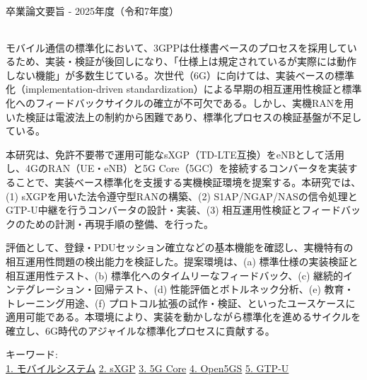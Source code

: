 卒業論文要旨 - 2025年度（令和7年度）
\begin{center}
\begin{large}
\end{large}
\end{center}
\begin{spacing}{1.2}
\small
モバイル通信の標準化において、3GPPは仕様書ベースのプロセスを採用しているため、実装・検証が後回しになり、「仕様上は規定されているが実際には動作しない機能」が多数生じている。次世代（6G）に向けては、実装ベースの標準化（implementation-driven standardization）による早期の相互運用性検証と標準化へのフィードバックサイクルの確立が不可欠である。しかし、実機RANを用いた検証は電波法上の制約から困難であり、標準化プロセスの検証基盤が不足している。

本研究は、免許不要帯で運用可能なsXGP（TD-LTE互換）をeNBとして活用し、4GのRAN（UE・eNB）と5G Core（5GC）を接続するコンバータを実装することで、実装ベース標準化を支援する実機検証環境を提案する。本研究では、(1) sXGPを用いた法令遵守型RANの構築、(2) S1AP/NGAP/NASの信令処理とGTP-U中継を行うコンバータの設計・実装、(3) 相互運用性検証とフィードバックのための計測・再現手順の整備、を行った。

評価として、登録・PDUセッション確立などの基本機能を確認し、実機特有の相互運用性問題の検出能力を検証した。提案環境は、(a) 標準仕様の実装検証と相互運用性テスト、(b) 標準化へのタイムリーなフィードバック、(c) 継続的インテグレーション・回帰テスト、(d) 性能評価とボトルネック分析、(e) 教育・トレーニング用途、(f) プロトコル拡張の試作・検証、といったユースケースに適用可能である。本環境により、実装を動かしながら標準化を進めるサイクルを確立し、6G時代のアジャイルな標準化プロセスに貢献する。

\end{spacing}

キーワード:\\
\underline{1. モバイルシステム}
\underline{2. sXGP}
\underline{3. 5G Core}
\underline{4. Open5GS}
\underline{5. GTP-U}
\begin{flushright}
\dept \\
\author
\end{flushright}
